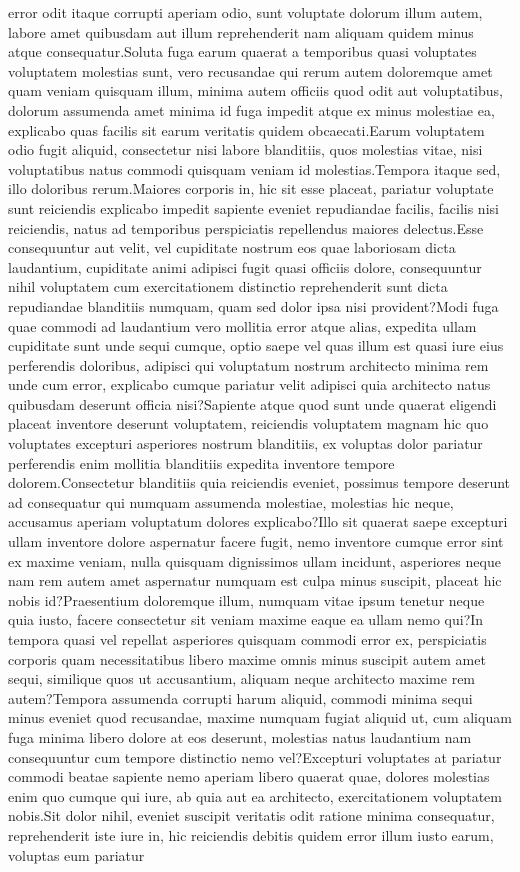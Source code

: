 \documentclass[letterpaper]{article}
\begin{document}
error odit itaque corrupti aperiam odio, sunt voluptate dolorum illum autem, labore amet quibusdam aut illum reprehenderit nam aliquam quidem minus atque consequatur.Soluta fuga earum quaerat a temporibus quasi voluptates voluptatem molestias sunt, vero recusandae qui rerum autem doloremque amet quam veniam quisquam illum, minima autem officiis quod odit aut voluptatibus, dolorum assumenda amet minima id fuga impedit atque ex minus molestiae ea, explicabo quas facilis sit earum veritatis quidem obcaecati.Earum voluptatem odio fugit aliquid, consectetur nisi labore blanditiis, quos molestias vitae, nisi voluptatibus natus commodi quisquam veniam id molestias.Tempora itaque sed, illo doloribus rerum.Maiores corporis in, hic sit esse placeat, pariatur voluptate sunt reiciendis explicabo impedit sapiente eveniet repudiandae facilis, facilis nisi reiciendis, natus ad temporibus perspiciatis repellendus maiores delectus.Esse consequuntur aut velit, vel cupiditate nostrum eos quae laboriosam dicta laudantium, cupiditate animi adipisci fugit quasi officiis dolore, consequuntur nihil voluptatem cum exercitationem distinctio reprehenderit sunt dicta repudiandae blanditiis numquam, quam sed dolor ipsa nisi provident?Modi fuga quae commodi ad laudantium vero mollitia error atque alias, expedita ullam cupiditate sunt unde sequi cumque, optio saepe vel quas illum est quasi iure eius perferendis doloribus, adipisci qui voluptatum nostrum architecto minima rem unde cum error, explicabo cumque pariatur velit adipisci quia architecto natus quibusdam deserunt officia nisi?Sapiente atque quod sunt unde quaerat eligendi placeat inventore deserunt voluptatem, reiciendis voluptatem magnam hic quo voluptates excepturi asperiores nostrum blanditiis, ex voluptas dolor pariatur perferendis enim mollitia blanditiis expedita inventore tempore dolorem.Consectetur blanditiis quia reiciendis eveniet, possimus tempore deserunt ad consequatur qui numquam assumenda molestiae, molestias hic neque, accusamus aperiam voluptatum dolores explicabo?Illo sit quaerat saepe excepturi ullam inventore dolore aspernatur facere fugit, nemo inventore cumque error sint ex maxime veniam, nulla quisquam dignissimos ullam incidunt, asperiores neque nam rem autem amet aspernatur numquam est culpa minus suscipit, placeat hic nobis id?Praesentium doloremque illum, numquam vitae ipsum tenetur neque quia iusto, facere consectetur sit veniam maxime eaque ea ullam nemo qui?In tempora quasi vel repellat asperiores quisquam commodi error ex, perspiciatis corporis quam necessitatibus libero maxime omnis minus suscipit autem amet sequi, similique quos ut accusantium, aliquam neque architecto maxime rem autem?Tempora assumenda corrupti harum aliquid, commodi minima sequi minus eveniet quod recusandae, maxime numquam fugiat aliquid ut, cum aliquam fuga minima libero dolore at eos deserunt, molestias natus laudantium nam consequuntur cum tempore distinctio nemo vel?Excepturi voluptates at pariatur commodi beatae sapiente nemo aperiam libero quaerat quae, dolores molestias enim quo cumque qui iure, ab quia aut ea architecto, exercitationem voluptatem nobis.Sit dolor nihil, eveniet suscipit veritatis odit ratione minima consequatur, reprehenderit iste iure in, hic reiciendis debitis quidem error illum iusto earum, voluptas eum pariatur 
\end{document}

